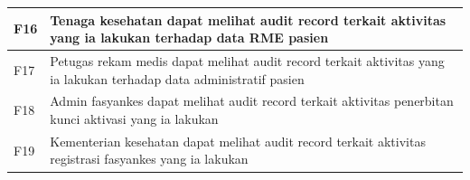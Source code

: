 \begin{xltabular}{\textwidth}{|>{\centering\arraybackslash}p{1.3cm}|X|}
    \hline
    F16 & Tenaga kesehatan dapat melihat audit record terkait aktivitas yang ia lakukan terhadap data RME pasien \\
    \hline
    F17 & Petugas rekam medis dapat melihat audit record terkait aktivitas yang ia lakukan terhadap data administratif pasien \\
    \hline
    F18 & Admin fasyankes dapat melihat audit record terkait aktivitas penerbitan kunci aktivasi yang ia lakukan \\
    \hline
    F19 & Kementerian kesehatan dapat melihat audit record terkait aktivitas registrasi fasyankes yang ia lakukan \\
    \hline

\end{xltabular}